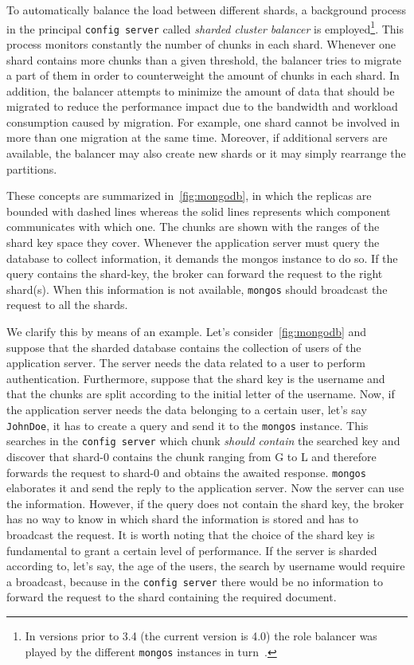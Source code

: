 To automatically balance the load between different shards, a background process
in the principal \texttt{config server} called \emph{sharded cluster balancer}
is employed\footnote{In versions prior to 3.4 (the current version is 4.0) the
role balancer was played by the different \texttt{mongos} instances in
turn~\cite{bib:mongodb-docs}.}. This process monitors constantly the number of
chunks in each shard. Whenever one shard contains more chunks than a given
threshold, the balancer tries to migrate a part of them in order to
counterweight the amount of chunks in each shard. In addition, the balancer
attempts to minimize the amount of data that should be migrated to reduce the
performance impact due to the bandwidth and workload consumption caused by
migration. For example, one shard cannot be involved in more than one migration
at the same time. Moreover, if additional servers are available, the balancer
may also create new shards or it may simply rearrange the partitions.

These concepts are summarized in~\autoref{fig:mongodb}, in which the replicas
are bounded with dashed lines whereas the solid lines represents which component
communicates with which one. The chunks are shown with the ranges of the shard
key space they cover. Whenever the application server must query the database to
collect information, it demands the mongos instance to do so. If the query
contains the shard-key, the broker can forward the request to the right
shard(s). When this information is not available, \texttt{mongos} should
broadcast the request to all the shards.

We clarify this by means of an example. Let's consider~\autoref{fig:mongodb} and
suppose that the sharded database contains the collection of users of the
application server. The server needs the data related to a user to perform
authentication. Furthermore, suppose that the shard key is the username and that
the chunks are split according to the initial letter of the username. Now, if
the application server needs the data belonging to a certain user, let's say
\texttt{JohnDoe}, it has to create a query and send it to the \texttt{mongos}
instance. This searches in the \texttt{config server} which chunk \emph{should
contain} the searched key and discover that shard-0 contains the chunk ranging
from G to L and therefore forwards the request to shard-0 and obtains the
awaited response. \texttt{mongos} elaborates it and send the reply to the
application server. Now the server can use the information. However, if the
query does not contain the shard key, the broker has no way to know in which
shard the information is stored and has to broadcast the request. It is worth
noting that the choice of the shard key is fundamental to grant a certain level
of performance. If the server is sharded according to, let's say, the age of the
users, the search by username would require a broadcast, because in the
\texttt{config server} there would be no information to forward the request to
the shard containing the required document.


